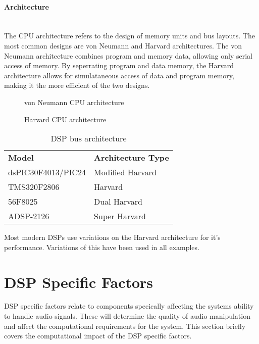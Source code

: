 \documentclass[titlepage]{scrartcl}
\begin{document}
    \paragraph{Architecture}~\\
    The CPU architecture refers to the design of memory units and bus layouts.
    The most common designs are von Neumann and Harvard architectures. The von
    Neumann architecture combines program and memory data, allowing only serial
    access of memory. By seperrating program and data memory, the Harvard
    architecture allows for simulataneous access of data and program memory,
    making it the more efficient of the two designs.~\parencite[p.320-321]{raf2014fdlm}
    \begin{figure}[H]
        \caption{von Neumann CPU architecture}
    \end{figure}
    \begin{figure}[H]
        \caption{Harvard CPU architecture}
    \end{figure}

    \begin{table}[H]
    \centering
    \caption{DSP bus architecture}
    \label{my-label}
    \begin{tabular}{ll}
        \textbf{Model}              & \textbf{Architecture Type}\\
        dsPIC30F4013/PIC24 & Modified Harvard\\
        TMS320F2806        & Harvard\\
        56F8025            & Dual Harvard\\
        ADSP-2126          & Super Harvard
    \end{tabular}
    \end{table}

    Most modern DSPs use variations on the Harvard architecture for it's
    performance. Variations of this have been used in all examples.

    \section{DSP Specific Factors}
    DSP specific factors relate to components specically affecting the systems
    ability to handle audio signals. These will determine the quality of audio
    manipulation and affect the computational requirements for the system. This
    section briefly covers the computational impact of the DSP specific
    factors.
\end{document}
